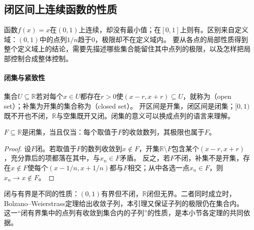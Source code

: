 \subsection{闭区间上连续函数的性质}
\label{sec:ru-closed-interval-continuity}
\label{sec:analysis-metric-measurement}
\label{sec:analysis-set-metric}

函数$f(x)=x$在$(0,1)$上连续，却没有最小值；在$[0,1]$上则有。区别来自定义域：$(0,1)$中的点列$1/n$趋于$0$，极限却不在定义域内。
要从各点的局部性质得到整个定义域上的结论，需要先描述哪些集合能留住其中点列的极限，以及怎样把局部控制合成整体控制。

\paragraph{闭集与紧致性}
集合$U\subseteq\mathbb R$若对每个$x\in U$都存在$r>0$使$(x-r,x+r)\subseteq U$，就称为（open set）；补集为开集的集合称为（closed set）。
开区间是开集，闭区间是闭集；$[0,1)$既不开也不闭，$\mathbb R$与空集既开又闭。闭集的意义可以换成点列的语言来理解。
\begin{lemma}[闭集的序列判据]
\label{lem:analysis-closed-sequence-criterion}
$F\subseteq\mathbb R$是闭集，当且仅当：每个取值于$F$的收敛数列，其极限也属于$F$。
\end{lemma}
\begin{proof}
设$F$闭。若取值于$F$的数列收敛到$x\notin F$，开集$\mathbb R\setminus F$包含某个$(x-r,x+r)$，充分靠后的项都落在其中，与$x_n\in F$矛盾。
反之，若$F$不闭，补集不是开集，存在$x\notin F$使每个$(x-1/n,x+1/n)$都与$F$相交；从中各选一点$x_n\in F$，则$x_n\to x\notin F$。
\end{proof}
闭与有界是不同的性质：$(0,1)$有界但不闭，$\mathbb R$闭但无界。二者同时成立时，Bolzano--Weierstrass定理给出收敛子列，本引理又保证子列的极限仍在集合内。
这一“闭有界集中的点列有收敛到集合内的子列”的性质，是本小节各定理的共同依据。

